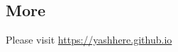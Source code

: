 \documentclass[margin, centered, 10.5pt]{res}
\begin{document}
\begin{resume}




\section{More} 
Please visit \href{https://yashhere.github.io}{https://yashhere.github.io}
\end{resume}
\end{document}
